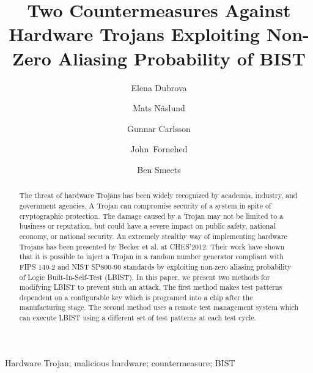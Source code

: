 \documentclass[a4paper]{llncs}
\newenvironment{keywords}{
       \list{}{\advance\topsep by0.35cm\relax\small
       \leftmargin=1cm
       \labelwidth=0.35cm
       \listparindent=0.35cm
       \itemindent\listparindent
       \rightmargin\leftmargin}\item[\hskip\labelsep
                                     \bfseries Keywords:]}
     {\endlist}
\begin{document}
\pagestyle{headings}  

\title{Two Countermeasures Against Hardware Trojans Exploiting Non-Zero Aliasing Probability of BIST}
\author{Elena Dubrova \and Mats N\"aslund \and
Gunnar Carlsson \and John~Fornehed \and Ben Smeets}


\maketitle

\begin{abstract}

The threat of hardware Trojans has been widely recognized by academia, industry, and government agencies. A Trojan can compromise security of a system in spite of cryptographic protection. The damage caused by a Trojan may not be limited to a business or reputation, but could have a severe impact on public safety, national economy, or national security. An extremely stealthy way of implementing hardware Trojans has been presented by Becker et al. at CHES'2012. Their work have shown that it is possible to inject a Trojan in a random number generator compliant with FIPS 140-2 and NIST SP800-90 standards by exploiting non-zero aliasing probability of Logic Built-In-Self-Test (LBIST). In this paper, we present two methods for modifying LBIST to prevent such an attack. The first method makes test patterns dependent on a configurable key which is programed into a chip after the manufacturing stage. The second method uses a remote test management system which can execute LBIST using a different set of test patterns at each test cycle. 
\end{abstract}

\begin{keywords} 
Hardware Trojan; malicious hardware; countermeasure; BIST
\end{keywords}
\end{document}
